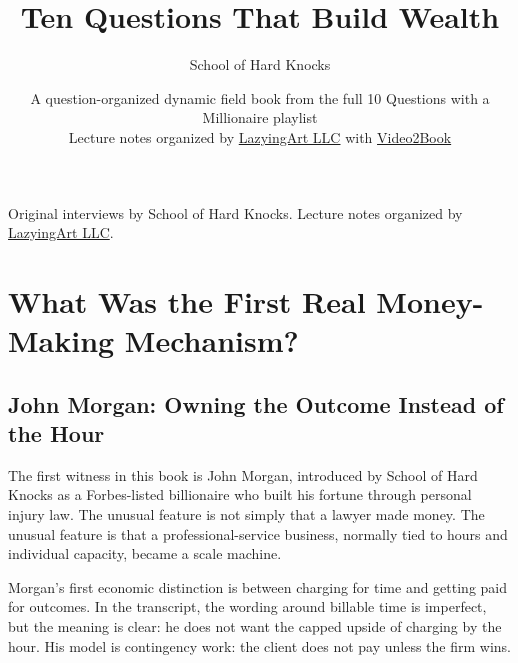 \documentclass[11pt,oneside]{book}
\begin{document}
\makeatletter
\renewcommand{\@pnumwidth}{2.2em}
\renewcommand{\@tocrmarg}{3.0em}
\renewcommand{\numberline}[1]{\hb@xt@4.2em{#1\hfil}}
\makeatother

\frontmatter

\title{Ten Questions That Build Wealth}
\author{School of Hard Knocks}
\date{A question-organized dynamic field book from the full 10 Questions with a Millionaire playlist \\ Lecture notes organized by \href{https://lazying.art}{LazyingArt LLC} with \href{https://github.com/lachlanchen/Video2Book}{Video2Book}}
\maketitle
\begin{center}
\small Original interviews by School of Hard Knocks. Lecture notes organized by \href{https://lazying.art}{LazyingArt LLC}.
\end{center}
\clearpage
\tableofcontents
\mainmatter


\chapter{What Was the First Real Money-Making Mechanism?}

\section{John Morgan: Owning the Outcome Instead of the Hour}

The first witness in this book is John Morgan, introduced by School of Hard Knocks as a Forbes-listed billionaire who built his fortune through personal injury law. The unusual feature is not simply that a lawyer made money. The unusual feature is that a professional-service business, normally tied to hours and individual capacity, became a scale machine.

Morgan's first economic distinction is between charging for time and getting paid for outcomes. In the transcript, the wording around billable time is imperfect, but the meaning is clear: he does not want the capped upside of charging by the hour. His model is contingency work: the client does not pay unless the firm wins.
\end{document}
